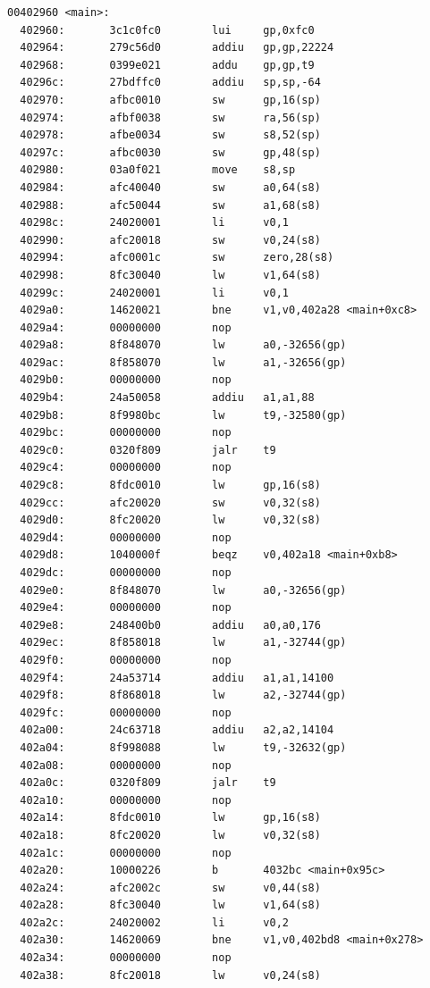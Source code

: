 \documentclass[11pt]{article}
\begin{document}
\begin{verbatim}
00402960 <main>:
  402960:       3c1c0fc0        lui     gp,0xfc0
  402964:       279c56d0        addiu   gp,gp,22224
  402968:       0399e021        addu    gp,gp,t9
  40296c:       27bdffc0        addiu   sp,sp,-64
  402970:       afbc0010        sw      gp,16(sp)
  402974:       afbf0038        sw      ra,56(sp)
  402978:       afbe0034        sw      s8,52(sp)
  40297c:       afbc0030        sw      gp,48(sp)
  402980:       03a0f021        move    s8,sp
  402984:       afc40040        sw      a0,64(s8)
  402988:       afc50044        sw      a1,68(s8)
  40298c:       24020001        li      v0,1
  402990:       afc20018        sw      v0,24(s8)
  402994:       afc0001c        sw      zero,28(s8)
  402998:       8fc30040        lw      v1,64(s8)
  40299c:       24020001        li      v0,1
  4029a0:       14620021        bne     v1,v0,402a28 <main+0xc8>
  4029a4:       00000000        nop
  4029a8:       8f848070        lw      a0,-32656(gp)
  4029ac:       8f858070        lw      a1,-32656(gp)
  4029b0:       00000000        nop
  4029b4:       24a50058        addiu   a1,a1,88
  4029b8:       8f9980bc        lw      t9,-32580(gp)
  4029bc:       00000000        nop
  4029c0:       0320f809        jalr    t9
  4029c4:       00000000        nop
  4029c8:       8fdc0010        lw      gp,16(s8)
  4029cc:       afc20020        sw      v0,32(s8)
  4029d0:       8fc20020        lw      v0,32(s8)
  4029d4:       00000000        nop
  4029d8:       1040000f        beqz    v0,402a18 <main+0xb8>
  4029dc:       00000000        nop
  4029e0:       8f848070        lw      a0,-32656(gp)
  4029e4:       00000000        nop
  4029e8:       248400b0        addiu   a0,a0,176
  4029ec:       8f858018        lw      a1,-32744(gp)
  4029f0:       00000000        nop
  4029f4:       24a53714        addiu   a1,a1,14100
  4029f8:       8f868018        lw      a2,-32744(gp)
  4029fc:       00000000        nop
  402a00:       24c63718        addiu   a2,a2,14104
  402a04:       8f998088        lw      t9,-32632(gp)
  402a08:       00000000        nop
  402a0c:       0320f809        jalr    t9
  402a10:       00000000        nop
  402a14:       8fdc0010        lw      gp,16(s8)
  402a18:       8fc20020        lw      v0,32(s8)
  402a1c:       00000000        nop
  402a20:       10000226        b       4032bc <main+0x95c>
  402a24:       afc2002c        sw      v0,44(s8)
  402a28:       8fc30040        lw      v1,64(s8)
  402a2c:       24020002        li      v0,2
  402a30:       14620069        bne     v1,v0,402bd8 <main+0x278>
  402a34:       00000000        nop
  402a38:       8fc20018        lw      v0,24(s8)

\end{verbatim}
\end{document}
